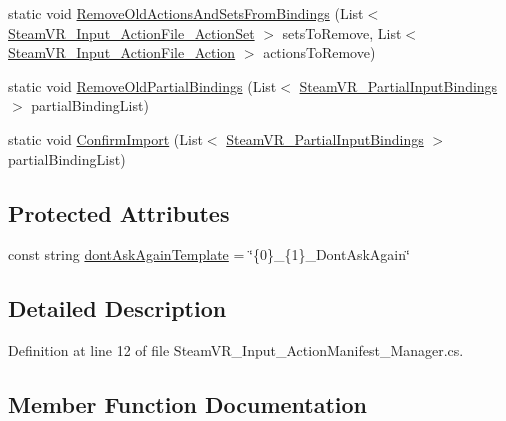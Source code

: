 \begin{DoxyCompactItemize}
\item 
static void \mbox{\hyperlink{class_valve_1_1_v_r_1_1_steam_v_r___input___action_manifest___manager_adfd8e2c3221d8e9f790081d8f5afdadb}{Remove\+Old\+Actions\+And\+Sets\+From\+Bindings}} (List$<$ \mbox{\hyperlink{class_valve_1_1_v_r_1_1_steam_v_r___input___action_file___action_set}{Steam\+V\+R\+\_\+\+Input\+\_\+\+Action\+File\+\_\+\+Action\+Set}} $>$ sets\+To\+Remove, List$<$ \mbox{\hyperlink{class_valve_1_1_v_r_1_1_steam_v_r___input___action_file___action}{Steam\+V\+R\+\_\+\+Input\+\_\+\+Action\+File\+\_\+\+Action}} $>$ actions\+To\+Remove)
\item 
static void \mbox{\hyperlink{class_valve_1_1_v_r_1_1_steam_v_r___input___action_manifest___manager_ac5a5b25cfebab833ec996fc78538af5f}{Remove\+Old\+Partial\+Bindings}} (List$<$ \mbox{\hyperlink{class_valve_1_1_v_r_1_1_steam_v_r___partial_input_bindings}{Steam\+V\+R\+\_\+\+Partial\+Input\+Bindings}} $>$ partial\+Binding\+List)
\item 
static void \mbox{\hyperlink{class_valve_1_1_v_r_1_1_steam_v_r___input___action_manifest___manager_af7cc91f9ef9ac980e2895ee1e749a77b}{Confirm\+Import}} (List$<$ \mbox{\hyperlink{class_valve_1_1_v_r_1_1_steam_v_r___partial_input_bindings}{Steam\+V\+R\+\_\+\+Partial\+Input\+Bindings}} $>$ partial\+Binding\+List)
\end{DoxyCompactItemize}
\subsection*{Protected Attributes}
\begin{DoxyCompactItemize}
\item 
const string \mbox{\hyperlink{class_valve_1_1_v_r_1_1_steam_v_r___input___action_manifest___manager_af24bac92a337589066ab3cb2ae03de50}{dont\+Ask\+Again\+Template}} = \char`\"{}\{0\}\+\_\+\{1\}\+\_\+\+Dont\+Ask\+Again\char`\"{}
\end{DoxyCompactItemize}


\subsection{Detailed Description}


Definition at line 12 of file Steam\+V\+R\+\_\+\+Input\+\_\+\+Action\+Manifest\+\_\+\+Manager.\+cs.



\subsection{Member Function Documentation}
\mbox{\label{class_valve_1_1_v_r_1_1_steam_v_r___input___action_manifest___manager_a5ddf34cbcdb0e80b9dd2dfe8c0cbf3f7}} 
